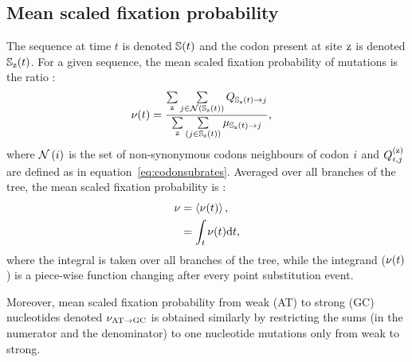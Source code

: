 \subsection{Mean scaled fixation probability}
\label{subsec:fixation-bias}
The sequence at time $t$ is denoted $\mathbb{S}(t)$ and the codon present at site $\text{z}$ is denoted $\mathbb{S}_{\text{z}}(t)$.
For a given sequence, the mean scaled fixation probability of mutations is the ratio :
\begin{align}
    \nu (t) & = \dfrac{ \sum\limits_{\text{z}} \sum\limits_{{j} \in \mathcal{N} \left ( \mathbb{S}_{\text{z}}(t) \right)} Q_{\mathbb{S}_{\text{z}}(t) \to {j}}}{ \sum\limits_{\text{z}} \sum\limits_{\left ( {j} \in \mathbb{S}_{\text{z}}(t) \right)} \mu_{\mathbb{S}_{\text{z}}(t) \to {j}}},
\end{align}
where $\mathcal{N}\left({i}\right)$ is the set of non-synonymous codons neighbours of codon ${i}$ and $Q_{{i}, {j}}^{(\text{z})}$ are defined as in equation~\ref{eq:codonsubrates}.
Averaged over all branches of the tree, the mean scaled fixation probability is :
\begin{align}
    \nu & = \left\langle \nu (t) \right\rangle, \\
    & = \int_{t} \nu (t) \text{d} t,
\end{align}
where the integral is taken over all branches of the tree, while the integrand ($\nu (t)$) is a piece-wise function changing after every point substitution event.

Moreover, mean scaled fixation probability from weak (AT) to strong (GC) nucleotides denoted $\nu_{\text{AT} \rightarrow \text{GC}}$ is obtained similarly by restricting the sums (in the numerator and the denominator) to one nucleotide mutations only from weak to strong.

